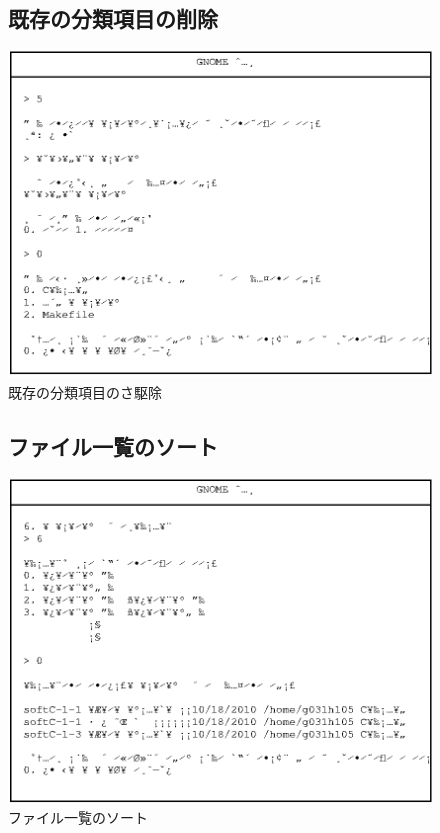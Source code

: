 \documentclass[a4j]{jarticle}
\begin{document}
\begin{figure}[h]
\subsection{既存の分類項目の削除}
\includegraphics{del_category.eps}
\caption{既存の分類項目のさ駆除}
\end{figure}

\begin{figure}[htb]
\subsection{ファイル一覧のソート}
\includegraphics{data_sort.eps}
\caption{ファイル一覧のソート}
\end{figure}
\end{document}
